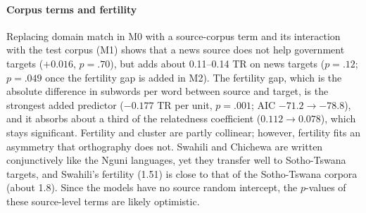 \paragraph{Corpus terms and fertility} Replacing domain match in M0 with a source-corpus term and its interaction with the test corpus (M1) shows that a news source does not help government targets ($+0.016$, $p=.70$), but adds about 0.11--0.14 TR on news targets ($p=.12$; $p=.049$ once the fertility gap is added in M2). The fertility gap, which is the absolute difference in subwords per word between source and target, is the strongest added predictor ($-0.177$ TR per unit, $p=.001$; AIC $-71.2\rightarrow-78.8$), and it absorbs about a third of the relatedness coefficient ($0.112\rightarrow0.078$), which stays significant. Fertility and cluster are partly collinear; however, fertility fits an asymmetry that orthography does not. Swahili and Chichewa are written conjunctively like the Nguni languages, yet they transfer well to Sotho-Tswana targets, and Swahili's fertility (1.51) is close to that of the Sotho-Tswana corpora (about 1.8). Since the models have no source random intercept, the $p$-values of these source-level terms are likely optimistic.

